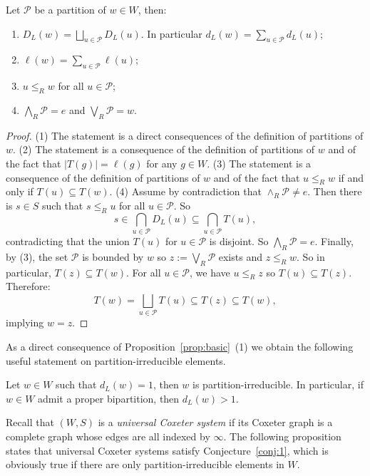 \documentclass[ALCO,Unicode]{cedram}
\theoremstyle{definition}
\begin{document}
\begin{prop}\label{prop:basic} Let $\mathcal P$ be a partition of $w\in W$, then:
\begin{enumerate}
\item $D_L(w)=\bigsqcup_{u\in \mathcal P} D_L(u)$. In particular $d_L(w)=\sum_{u\in\mathcal P} d_L(u)$;
\item $\ell(w)=\sum_{u\in \mathcal P} \ell(u)$;
\item $u\leq_R w$ for all $u\in\mathcal P$;
\item $\bigwedge_R \mathcal P = e$ and $\bigvee_R\mathcal P=w$.
\end{enumerate}
\end{prop}
\begin{proof}  (1) The statement is a direct consequences of the definition of partitions of $w$.  (2) The statement is a consequence of the definition of partitions of $w$ and of the fact that $|T(g)|=\ell(g)$ for any $g\in W$. (3) The statement is a consequence of the definition of partitions of $w$ and of the fact that $u\leq_R w$ if and only if $T(u)\subseteq T(w)$. (4) Assume by contradiction that $\wedge_R \mathcal P \not = e$. Then there is $s \in S$ such that $s\leq_R u$ for all $u\in\mathcal P$. So 
$$
s\in \bigcap_{u\in\mathcal P}D_L(u)\subseteq \bigcap_{u\in\mathcal P} T(u),
$$
contradicting that the union $T(u)$ for $u\in\mathcal P$ is disjoint. So $\bigwedge_R \mathcal P = e$. Finally, by (3), the set $\mathcal P$ is bounded by $w$ so $z:=\bigvee_R \mathcal P$ exists and $z\leq_R w$. So in particular, $T(z)\subseteq T(w)$. For all $u\in\mathcal P$, we have $u\leq_R z$ so $T(u)\subseteq T(z)$. Therefore: 
$$
T(w)= \bigsqcup_{u\in\mathcal P} T(u)\subseteq T(z)\subseteq T(w),
$$
implying $w=z$.
\end{proof}

As a direct consequence of Proposition~\ref{prop:basic}~(1) we obtain the following useful statement on partition-irreducible elements.

\begin{coro}\label{cor:Bi} Let $w\in W$ such that $d_L(w)=1$, then $w$ is partition-irreducible. In particular, if $w\in W$ admit a proper bipartition, then $d_L(w)>1$.
\end{coro}

Recall that $(W,S)$ is a {\em universal Coxeter system} if its Coxeter graph is a complete graph whose edges are all indexed by $\infty$. The following proposition states that universal Coxeter systems satisfy Conjecture~\ref{conj:1}, which is obviously true if there are only partition-irreducible elements in $W$.
\end{document}
